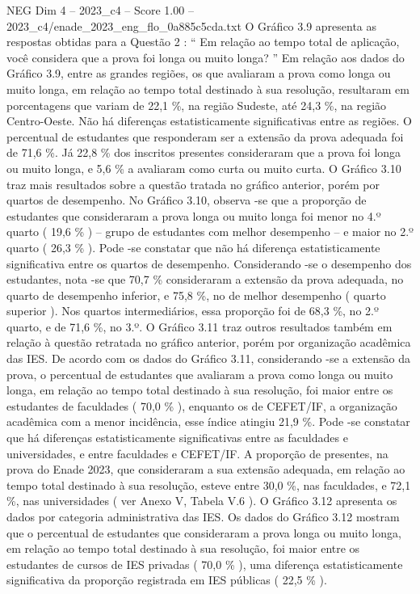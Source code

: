 \begin{textsample}{NEG Dim 4 – 2023\_c4 – Score 1.00 – 2023\_c4/enade\_2023\_eng\_flo\_0a885c5cda.txt}
O Gráfico 3.9 apresenta as respostas obtidas para a Questão 2 : “ Em relação ao tempo total de aplicação, você considera que a prova foi longa ou muito longa? ” Em relação aos dados do Gráfico 3.9, entre as grandes regiões, os que avaliaram a prova como longa ou muito longa, em relação ao tempo total destinado à sua resolução, resultaram em porcentagens que variam de 22,1 \%, na região Sudeste, até 24,3 \%, na região Centro-Oeste.
Não há diferenças estatisticamente significativas entre as regiões.
O percentual de estudantes que responderam ser a extensão da prova adequada foi de 71,6 \%.
Já 22,8 \% dos inscritos presentes consideraram que a prova foi longa ou muito longa, e 5,6 \% a avaliaram como curta ou muito curta.
O Gráfico 3.10 traz mais resultados sobre a questão tratada no gráfico anterior, porém por quartos de desempenho.
No Gráfico 3.10, observa -se que a proporção de estudantes que consideraram a prova longa ou muito longa foi menor no 4.º quarto ( 19,6 \% ) – grupo de estudantes com melhor desempenho – e maior no 2.º quarto ( 26,3 \% ).
Pode -se constatar que não há diferença estatisticamente significativa entre os quartos de desempenho.
Considerando -se o desempenho dos estudantes, nota -se que 70,7 \% consideraram a extensão da prova adequada, no quarto de desempenho inferior, e 75,8 \%, no de melhor desempenho ( quarto superior ).
Nos quartos intermediários, essa proporção foi de 68,3 \%, no 2.º quarto, e de 71,6 \%, no 3.º.
O Gráfico 3.11 traz outros resultados também em relação à questão retratada no gráfico anterior, porém por organização acadêmica das IES.
De acordo com os dados do Gráfico 3.11, considerando -se a extensão da prova, o percentual de estudantes que avaliaram a prova como longa ou muito longa, em relação ao tempo total destinado à sua resolução, foi maior entre os estudantes de faculdades ( 70,0 \% ), enquanto os de CEFET/IF, a organização acadêmica com a menor incidência, esse índice atingiu 21,9 \%.
Pode -se constatar que há diferenças estatisticamente significativas entre as faculdades e universidades, e entre faculdades e CEFET/IF.
A proporção de presentes, na prova do Enade 2023, que consideraram a sua extensão adequada, em relação ao tempo total destinado à sua resolução, esteve entre 30,0 \%, nas faculdades, e 72,1 \%, nas universidades ( ver Anexo V, Tabela V.6 ).
O Gráfico 3.12 apresenta os dados por categoria administrativa das IES.
Os dados do Gráfico 3.12 mostram que o percentual de estudantes que consideraram a prova longa ou muito longa, em relação ao tempo total destinado à sua resolução, foi maior entre os estudantes de cursos de IES privadas ( 70,0 \% ), uma diferença estatisticamente significativa da proporção registrada em IES públicas ( 22,5 \% ).

\end{textsample}

